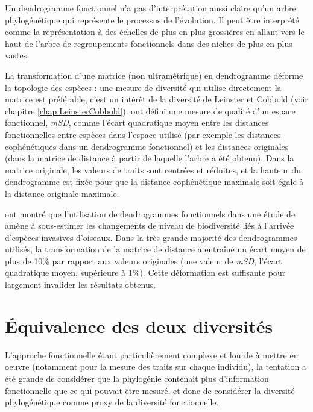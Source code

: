\documentclass[
  11pt,
  french,
  a4paper,
  extrafontsizes,onecolumn,openright
  ]{memoir}
\begin{document}
Un dendrogramme fonctionnel n'a pas d'interprétation aussi claire qu'un arbre phylogénétique qui représente le processus de l'évolution.
Il peut être interprété comme la représentation à des échelles de plus en plus grossières en allant vers le haut de l'arbre de regroupements fonctionnels dans des niches de plus en plus vastes.

La transformation d'une matrice (non ultramétrique) en dendrogramme déforme la topologie des espèces \autocite{Pavoine2005a,Podani2007}: une mesure de diversité qui utilise directement la matrice est préférable, c'est un intérêt de la diversité de Leinster et Cobbold (voir chapitre \ref{chap:LeinsterCobbold}).
\textcite{Maire2015} ont défini une mesure de qualité d'un espace fonctionnel, \emph{mSD}, comme l'écart quadratique moyen entre les distances fonctionnelles entre espèces dans l'espace utilisé (par exemple les distances cophénétiques dans un dendrogramme fonctionnel) et les distances originales (dans la matrice de distance à partir de laquelle l'arbre a été obtenu).
Dans la matrice originale, les valeurs de traits sont centrées et réduites, et la hauteur du dendrogramme est fixée pour que la distance cophénétique maximale soit égale à la distance originale maximale.

\textcite{Villeger2017} ont montré que l'utilisation de dendrogrammes fonctionnels dans une étude de \textcite{Sobral2016} amène à sous-estimer les changements de niveau de biodiversité liés à l'arrivée d'espèces invasives d'oiseaux.
Dans la très grande majorité des dendrogrammes utilisés, la transformation de la matrice de distance a entraîné un écart moyen de plus de 10\% par rapport aux valeurs originales (une valeur de \emph{mSD}, l'écart quadratique moyen, supérieure à 1\%).
Cette déformation est suffisante pour largement invalider les résultats obtenus.

\hypertarget{uxe9quivalence-des-deux-diversituxe9s}{%
\section{Équivalence des deux diversités}\label{uxe9quivalence-des-deux-diversituxe9s}}

L'approche fonctionnelle étant particulièrement complexe et lourde à mettre en oeuvre (notamment pour la mesure des traits sur chaque individu), la tentation a été grande de considérer que la phylogénie contenait plus d'information fonctionnelle que ce qui pouvait être mesuré, et donc de considérer la diversité phylogénétique comme proxy de la diversité fonctionnelle.
\end{document}
